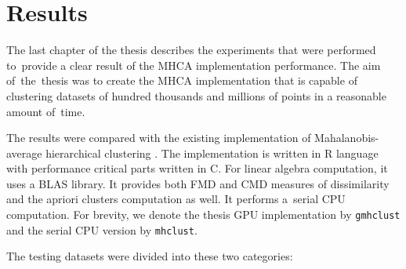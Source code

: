 \chapter{Results}
\label{sec04:res}

The last chapter of the thesis describes the experiments that were performed to~provide a clear result of the MHCA implementation performance. The aim of~the~thesis was to create the MHCA implementation that is capable of clustering datasets of hundred thousands and millions of points in a reasonable amount of~time.

The results were compared with the existing implementation of Mahalanobis-average hierarchical clustering \cite{fivser2012detection}. The implementation is written in R language with performance critical parts written in C. For linear algebra computation, it uses a BLAS library. It provides both FMD and CMD measures of dissimilarity and the apriori clusters computation as well. It performs a~serial CPU computation. For brevity, we denote the thesis GPU implementation by \texttt{gmhclust} and the serial CPU version by \texttt{mhclust}.

The testing datasets were divided into these two categories:

